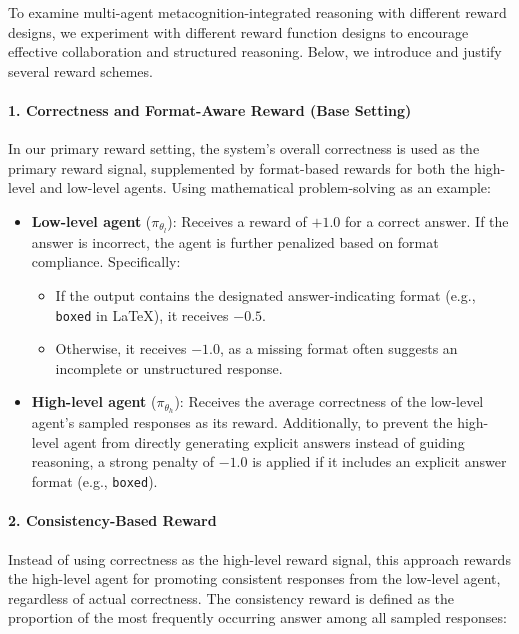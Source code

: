 To examine multi-agent metacognition-integrated reasoning with different reward designs, we experiment with different reward function designs to encourage effective collaboration and structured reasoning. Below, we introduce and justify several reward schemes.

\paragraph{1. Correctness and Format-Aware Reward (Base Setting)}
In our primary reward setting, the system's overall correctness is used as the primary reward signal, supplemented by format-based rewards for both the high-level and low-level agents. Using mathematical problem-solving as an example:

\begin{itemize}
    \item \textbf{Low-level agent} (\(\pi_{\theta_l}\)): Receives a reward of \(+1.0\) for a correct answer. If the answer is incorrect, the agent is further penalized based on format compliance. Specifically:
    \begin{itemize}
        \item If the output contains the designated answer-indicating format (e.g., \texttt{boxed} in LaTeX), it receives \(-0.5\).
        \item Otherwise, it receives \(-1.0\), as a missing format often suggests an incomplete or unstructured response.
    \end{itemize}
    \item \textbf{High-level agent} (\(\pi_{\theta_h}\)): Receives the average correctness of the low-level agent's sampled responses as its reward. Additionally, to prevent the high-level agent from directly generating explicit answers instead of guiding reasoning, a strong penalty of \(-1.0\) is applied if it includes an explicit answer format (e.g., \texttt{boxed}).
\end{itemize}

\paragraph{2. Consistency-Based Reward}
Instead of using correctness as the high-level reward signal, this approach rewards the high-level agent for promoting consistent responses from the low-level agent, regardless of actual correctness. The consistency reward is defined as the proportion of the most frequently occurring answer among all sampled responses:

